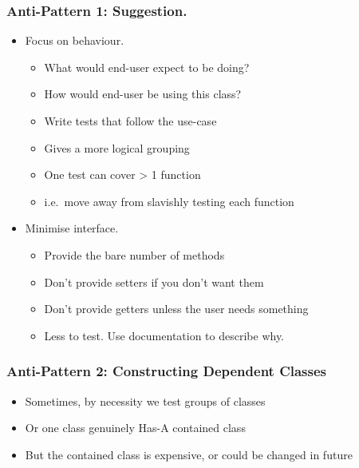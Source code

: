 \subsubsection{Anti-Pattern 1:
Suggestion.}\label{anti-pattern-1-suggestion.}

\begin{itemize}
\itemsep1pt\parskip0pt
\item
  Focus on behaviour.

  \begin{itemize}
  \itemsep1pt\parskip0pt
  \item
    What would end-user expect to be doing?
  \item
    How would end-user be using this class?
  \item
    Write tests that follow the use-case
  \item
    Gives a more logical grouping
  \item
    One test can cover \textgreater{} 1 function
  \item
    i.e.~move away from slavishly testing each function
  \end{itemize}
\item
  Minimise interface.

  \begin{itemize}
  \itemsep1pt\parskip0pt
  \item
    Provide the bare number of methods
  \item
    Don't provide setters if you don't want them
  \item
    Don't provide getters unless the user needs something
  \item
    Less to test. Use documentation to describe why.
  \end{itemize}
\end{itemize}

\subsubsection{Anti-Pattern 2: Constructing Dependent
Classes}\label{anti-pattern-2-constructing-dependent-classes}

\begin{itemize}
\itemsep1pt\parskip0pt
\item
  Sometimes, by necessity we test groups of classes
\item
  Or one class genuinely Has-A contained class
\item
  But the contained class is expensive, or could be changed in future
\end{itemize}

